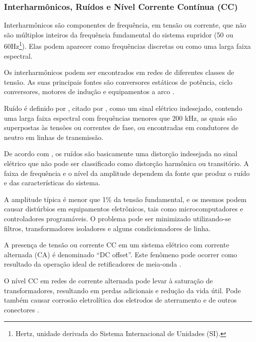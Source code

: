 \subsubsection{Interharmônicos, Ruídos e Nível Corrente Contínua (CC)}
\par
Interharmônicos são componentes de frequência, em tensão ou corrente, que não são múltiplos inteiros da frequência fundamental do sistema supridor (50 ou 60Hz\footnote{Hertz, unidade derivada do Sistema Internacional de Unidades (SI).}). Elas podem aparecer como frequências discretas ou como uma larga faixa espectral.
\par
Os interharmônicos podem ser encontrados em redes de diferentes classes de tensão. As suas principais fontes são conversores estáticos de potência, ciclo conversores, motores de indução e equipamentos a arco \cite{DEL03}.
\par
Ruído é definido por \cite{OLIVE}, citado por \cite{DEL03}, como um sinal elétrico indesejado, contendo uma larga faixa espectral com frequências menores que 200 kHz, as quais são superpostas às tensões ou correntes de fase, ou encontradas em condutores de neutro em linhas de transmissão.
\par
De acordo com \cite{DUG96}, os ruídos são basicamente uma distorção indesejada no sinal elétrico que não pode ser classificado como distorção harmônica ou transitório. A faixa de frequência e o nível da amplitude dependem da fonte que produz o ruído e das características do sistema. 
\par
A amplitude típica é menor que 1\% da tensão fundamental, e os mesmos podem causar distúrbios em equipamentos eletrônicos, tais como microcomputadores e controladores programáveis. O problema pode ser minimizado utilizando-se filtros, transformadores isoladores e alguns condicionadores de linha.
\par
A presença de tensão ou corrente CC em um sistema elétrico com corrente alternada (CA) é denominado “DC offset”. Este fenômeno pode ocorrer como resultado da operação ideal de retificadores de meia-onda \cite{OLIVE}.
\par
O nível CC em redes de corrente alternada pode levar à saturação de transformadores, resultando em perdas adicionais e redução da vida útil. Pode também causar corrosão eletrolítica dos eletrodos de aterramento e de outros conectores \cite{DEL03}.
